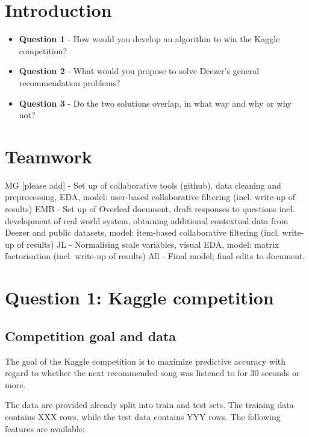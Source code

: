 \documentclass[
]{ceurart}
\begin{document}
\section{Introduction}



\begin{itemize}
    \item \textbf{Question 1} - How would you develop an algorithm to win the Kaggle competition?
    \item \textbf{Question 2} - What would you propose to solve Deezer's general recommendation problems?
    \item \textbf{Question 3} - Do the two solutions overlap, in what way and why or why not?
\end{itemize}


\section{Teamwork}

MG [please add] - Set up of collaborative tools (github), data cleaning and preprocessing, EDA, model: user-based collaborative filtering (incl. write-up of results)
EMB - Set up of Overleaf document, draft responses to questions incl. development of real world system, obtaining additional contextual data from Deezer and public datasets, model: item-based collaborative filtering (incl. write-up of results)
JL - Normalising scale variables, visual EDA, model: matrix factorisation (incl. write-up of results)
All - Final model; final edits to document.



\section{Question 1: Kaggle competition}

\subsection{Competition goal and data}

The goal of the Kaggle competition is to maximize predictive accuracy with regard to whether the next recommended song was listened to for 30 seconds or more.

The data are provided already split into train and test sets. The training data contains XXX rows, while the test data contains YYY rows. The following features are available:
\end{document}
